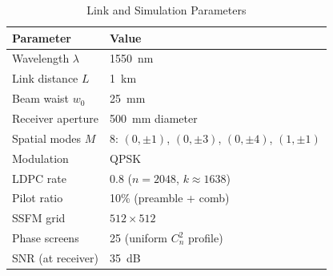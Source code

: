 \documentclass[journal]{IEEEtran}
\begin{document}
\begin{table}[htbp]
\centering
\caption{Link and Simulation Parameters}
\label{tab:link_params}
\small
\renewcommand{\arraystretch}{1.1}
\begin{tabular}{l l}
\toprule
\textbf{Parameter} & \textbf{Value} \\
\midrule
Wavelength $\lambda$ & 1550~nm \\
Link distance $L$ & 1~km \\
Beam waist $w_0$ & 25~mm \\
Receiver aperture & 500~mm diameter \\
Spatial modes $M$ & 8: $(0,\pm1)$, $(0,\pm3)$, $(0,\pm4)$, $(1,\pm1)$ \\
Modulation & QPSK \\
LDPC rate & 0.8 ($n=2048$, $k \approx 1638$) \\
Pilot ratio & 10\% (preamble + comb) \\
SSFM grid & $512 \times 512$ \\
Phase screens & 25 (uniform $C_n^2$ profile) \\
SNR (at receiver) & 35~dB \\
\bottomrule
\end{tabular}
\end{table}
\end{document}
